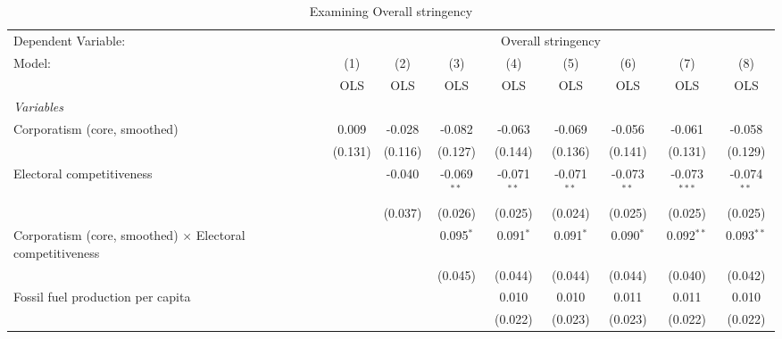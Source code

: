 
\begin{table}[htbp]
   \caption{Examining Overall stringency}
   \centering
   \begin{tabular}{lcccccccc}
      \toprule
      Dependent Variable: & \multicolumn{8}{c}{Overall stringency}\\
      Model:                                                           & (1)     & (2)     & (3)           & (4)           & (5)           & (6)           & (7)            & (8)\\  
                                                                       &  OLS    & OLS     & OLS           & OLS           & OLS           & OLS           & OLS            & OLS\\  
      \midrule
      \emph{Variables}\\
      Corporatism (core, smoothed)                                     & 0.009   & -0.028  & -0.082        & -0.063        & -0.069        & -0.056        & -0.061         & -0.058\\   
                                                                       & (0.131) & (0.116) & (0.127)       & (0.144)       & (0.136)       & (0.141)       & (0.131)        & (0.129)\\   
      Electoral competitiveness                                        &         & -0.040  & -0.069$^{**}$ & -0.071$^{**}$ & -0.071$^{**}$ & -0.073$^{**}$ & -0.073$^{***}$ & -0.074$^{**}$\\   
                                                                       &         & (0.037) & (0.026)       & (0.025)       & (0.024)       & (0.025)       & (0.025)        & (0.025)\\   
      Corporatism (core, smoothed) $\times$ Electoral competitiveness  &         &         & 0.095$^{*}$   & 0.091$^{*}$   & 0.091$^{*}$   & 0.090$^{*}$   & 0.092$^{**}$   & 0.093$^{**}$\\   
                                                                       &         &         & (0.045)       & (0.044)       & (0.044)       & (0.044)       & (0.040)        & (0.042)\\   
      Fossil fuel production per capita                                &         &         &               & 0.010         & 0.010         & 0.011         & 0.011          & 0.010\\   
                                                                       &         &         &               & (0.022)       & (0.023)       & (0.023)       & (0.022)        & (0.022)\\   

\end{tabular}
\end{table}

